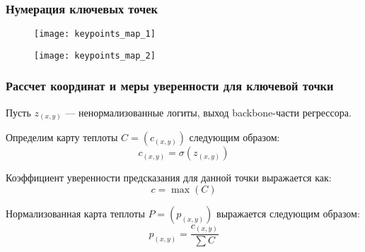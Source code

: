\begin{frame}
    \frametitle{Нумерация ключевых точек}
    \begin{figure}
        \begin{minipage}[!h]{0.49\linewidth}
            \centering
            \texttt{[image: keypoints\_map\_1]}
        \end{minipage}
        \hfill
        \begin{minipage}[!h]{0.49\linewidth}
            \centering
            \texttt{[image: keypoints\_map\_2]}
        \end{minipage}
    \end{figure}
\end{frame}

\begin{frame}
    \frametitle{Рассчет координат и меры уверенности для ключевой точки}
    Пусть $z_{(x, y)}$ --- ненормализованные логиты, выход backbone-части регрессора.

    Определим карту теплоты $C = (c_{(x, y)})$ следующим образом:
    $$ c_{(x, y)} = \sigma (z_{(x, y)})$$

    Коэффициент уверенности предсказания для данной точки выражается как:
    $$ c = \max(C) $$

    Нормализованная карта теплоты $P = (p_{(x, y)})$ выражается следующим образом:
    $$ p_{(x, y)} =  \frac{c_{(x, y)}}{\sum C}$$

\end{frame}